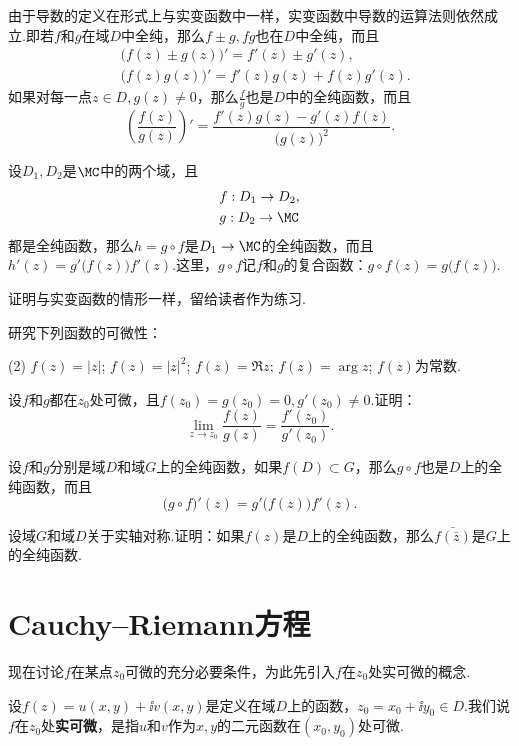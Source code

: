 由于导数的定义在形式上与实变函数中一样，实变函数中导数的运算法则依然成立.即若$f$和$g$在域$D$中全纯，那么$f\pm g,fg$也在$D$中全纯，而且
\begin{align*}
&\big(f(z)\pm g(z)\big)'=f'(z)\pm g'(z),\\
&\big(f(z)g(z)\big)'=f'(z)g(z)+f(z)g'(z).
\end{align*}
如果对每一点$z\in D,g(z)\ne 0$，那么$\frac fg$也是$D$中的全纯函数，而且
\[\left(\frac{f(z)}{g(z)}\right)'=\frac{f'(z)g(z)-g'(z)f(z)}{\big(g(z)\big)^2}.\]
\begin{prop}
设$D_1,D_2$是$\MC$中的两个域，且
\begin{align*}
&f:D_1\to D_2,\\
&g:D_2\to \MC
\end{align*}
都是全纯函数，那么$h=g\circ f$是$D_1\to\MC$的全纯函数，而且$h'(z)=g'\big(f(z)\big)f'(z)$.这里，$g\circ f$记$f$和$g$的复合函数：$g\circ f(z)=g\big(f(z)\big)$.
\end{prop}

证明与实变函数的情形一样，留给读者作为练习.
\begin{xiti}
\item 研究下列函数的可微性：
\begin{tasks}(2)
  \task $f(z)=|z|$;
  \task $f(z)=|z|^2$;
  \task $f(z)=\Re z$;
  \task $f(z)=\arg z$;
  \task $f(z)$为常数.
\end{tasks}
\item 设$f$和$g$都在$z_0$处可微，且$f(z_0)=g(z_0)=0,g'(z_0)\ne0$.证明：
\[\lim_{z\to z_0}\frac{f(z)}{g(z)}=\frac{f'(z_0)}{g'(z_0)}.\]
\item 设$f$和$g$分别是域$D$和域$G$上的全纯函数，如果$f(D)\subset G$，那么$g\circ f$也是$D$上的全纯函数，而且
\[\big(g\circ f\big)'(z)=g'\big(f(z)\big)f'(z).\]
\item 设域$G$和域$D$关于实轴对称.证明：如果$f(z)$是$D$上的全纯函数，那么$\bar{f(\bar z)}$是$G$上的全纯函数.
\end{xiti}

\section{Cauchy--Riemann方程\label{sec2.2}}
现在讨论$f$在某点$z_0$可微的充分必要条件，为此先引入$f$在$z_0$处实可微的概念.
\begin{definition}
设$f(z)=u(x,y)+\ii v(x,y)$是定义在域$D$上的函数，$z_0=x_0+\ii y_0\in D$.我们说$f$在$z_0$处\textbf{实可微}，是指$u$和$v$作为$x,y$的二元函数在$(x_0,y_0)$处可微.
\end{definition}

